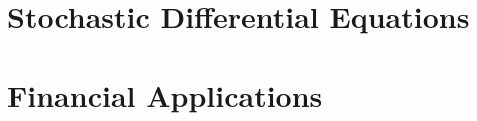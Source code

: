 \documentclass[a5paper]{book}
\begin{document}
\chapter{Stochastic Differential Equations}







\chapter{Financial Applications}



\nocite{*}



\end{document}
